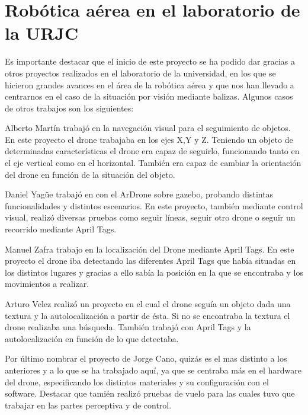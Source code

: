 	

\section{Rob\'otica a\'erea en el laboratorio de la URJC}
\hspace{1 cm} Es importante destacar que el inicio de este proyecto se ha podido dar gracias a otros proyectos realizados en el laboratorio de la universidad, en los que se hicieron grandes avances en el \'area de la rob\'otica a\'erea y que nos han llevado a centrarnos en el caso de la situaci\'on por visi\'on mediante balizas. Algunos casos de otros trabajos son los siguientes:

\hspace{1 cm} Alberto Mart\'in trabaj\'o en la navegaci\'on visual para el seguimiento de objetos. En este proyecto el drone trabajaba en los ejes X,Y y Z. Teniendo un objeto de determinadas caracter\'isticas el drone era capaz de seguirlo, funcionando tanto en el eje vertical como en el horizontal. Tambi\'en era capaz de cambiar la orientaci\'on del drone en funci\'on de la situaci\'on del objeto. 

\hspace{1 cm} Daniel Yag\"ue trabaj\'o en con el ArDrone sobre gazebo, probando distintas funcionalidades y distintos escenarios. En este proyecto, tambi\'en mediante control visual, realiz\'o diversas pruebas como seguir l\'ineas, seguir otro drone o seguir un recorrido mediante April Tags. 

\hspace{1 cm} Manuel Zafra trabajo en la localizaci\'on del Drone mediante April Tags. En este proyecto el drone iba detectando las diferentes April Tags que hab\'ia situadas en los distintos lugares y gracias a ello sab\'ia la posici\'on en la que se encontraba y los movimientos a realizar.  

\hspace{1 cm}Arturo Velez realiz\'o un proyecto en el cual el drone segu\'ia un objeto dada una textura y la autolocalizaci\'on a partir de \'esta. Si no se encontraba la textura el drone realizaba una b\'usqueda. Tambi\'en trabaj\'o con April Tags y la autolocalizaci\'on en funci\'on de lo que detectaba.

\hspace{1 cm} Por \'ultimo nombrar el proyecto de Jorge Cano, quiz\'as es el mas distinto a los anteriores y a lo que se ha trabajado aqu\'i, ya que se centraba m\'as en el hardware del drone, especificando los distintos materiales y su configuraci\'on con el software. Destacar que tami\'en realiz\'o pruebas de vuelo para las cuales tuvo que trabajar en las partes perceptiva y de control.

